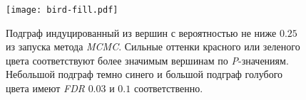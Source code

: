 \begin{figure}
    \centering
    \texttt{[image: bird-fill.pdf]}
    \caption{
        Подграф индуцированный из вершин с вероятностью не ниже $0.25$ из
        запуска метода \emph{MCMC}.  Сильные оттенки красного или зеленого
        цвета соответствуют более значимым вершинам по \emph{P}-значениям.
        Небольшой подграф темно синего и большой подграф голубого цвета имеют
        \emph{FDR} $0.03$ и $0.1$ соответственно.
    }%
    \label{fig:bird-fill}%
\end{figure}





\chapterconclusion

